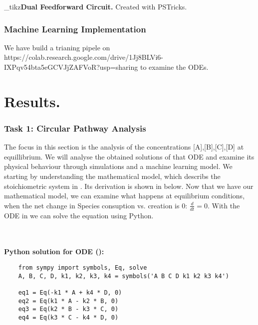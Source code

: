 \documentclass[11pt]{cls/labreport}
\begin{document}
\begin{multicols}{2}
\twocolstart
{\noindent\footnotesize\imgtaskB_tikz{\footnotesize \textbf{Dual Feedforward Circuit.} Created with PSTricks. }}

\section{Machine Learning Implementation}
 We have build a trianing pipele on https://colab.research.google.com/drive/1Jj8BLVi6-IXPqv54bta5eGCVJjZAFVoR?usp=sharing to examine the ODEs.
\twocolend 
{\footnotesize{}

\twocolstart


\part*{Results.}
\section{Task 1: Circular Pathway Analysis}
The focus in this section is the analysis of the concentrations [A],[B],[C],[D] at equillibrium. We will 
analyse the obtained solutions of that ODE and examine its physical behaviour through simulations and a machine learning model.
We starting by understanding the mathematical model, which describs the stoichiometric system in . Its derivation is shown in  below.
\twocolend
{}
\twocolstart
Now that we have our mathematical model, we can examine what happens at equilibrium conditions, when the net change in Species consuption vs. creation is 0: $\frac{d}{dt} = 0$. 
With the ODE in  we can solve the equation using Python.\\

\begin{codebox}
    \\
    \\ %
    \textbf{Python solution for ODE ():}  
    \begin{lstlisting}
    from sympy import symbols, Eq, solve
    A, B, C, D, k1, k2, k3, k4 = symbols('A B C D k1 k2 k3 k4')

    eq1 = Eq(-k1 * A + k4 * D, 0)
    eq2 = Eq(k1 * A - k2 * B, 0)
    eq3 = Eq(k2 * B - k3 * C, 0)
    eq4 = Eq(k3 * C - k4 * D, 0)


\end{lstlisting}
\end{codebox}}
\end{multicols}
\end{document}
